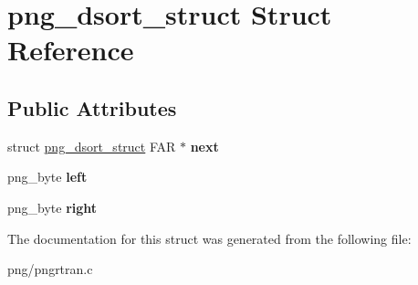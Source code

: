 \hypertarget{structpng__dsort__struct}{}\section{png\+\_\+dsort\+\_\+struct Struct Reference}
\label{structpng__dsort__struct}
\subsection*{Public Attributes}
\begin{DoxyCompactItemize}
\item 
struct \hyperlink{structpng__dsort__struct}{png\+\_\+dsort\+\_\+struct} F\+AR $\ast$ {\bfseries next}\hypertarget{structpng__dsort__struct_a1220c12ccc8d2eb1f3c0f49548efdfe7}{}\label{structpng__dsort__struct_a1220c12ccc8d2eb1f3c0f49548efdfe7}

\item 
png\+\_\+byte {\bfseries left}\hypertarget{structpng__dsort__struct_a09ba275bb5489f22e906be30b63f5452}{}\label{structpng__dsort__struct_a09ba275bb5489f22e906be30b63f5452}

\item 
png\+\_\+byte {\bfseries right}\hypertarget{structpng__dsort__struct_a9cfe3ab6de9319c0d18dd16075c21fa2}{}\label{structpng__dsort__struct_a9cfe3ab6de9319c0d18dd16075c21fa2}

\end{DoxyCompactItemize}


The documentation for this struct was generated from the following file\+:\begin{DoxyCompactItemize}
\item 
png/pngrtran.\+c\end{DoxyCompactItemize}
